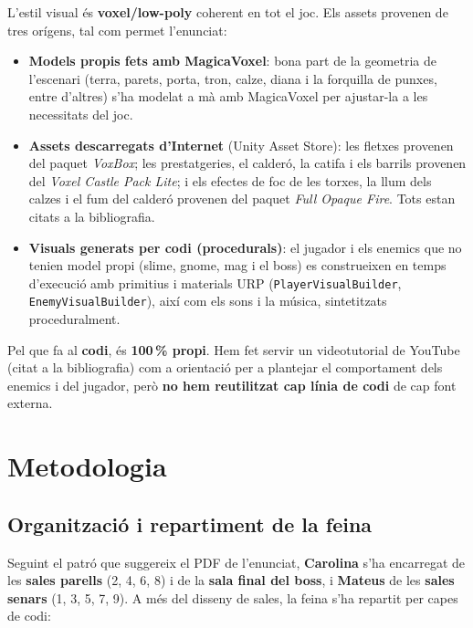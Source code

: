 \documentclass[11pt,a4paper]{article}
\begin{document}
L'estil visual és \textbf{voxel/low-poly} coherent en tot el joc. Els assets
provenen de tres orígens, tal com permet l'enunciat:

\begin{itemize}[noitemsep]
    \item \textbf{Models propis fets amb MagicaVoxel}: bona part de la geometria
    de l'escenari (terra, parets, porta, tron, calze, diana i la forquilla de
    punxes, entre d'altres) s'ha modelat a mà amb MagicaVoxel per ajustar-la a les
    necessitats del joc.
    \item \textbf{Assets descarregats d'Internet} (Unity Asset Store): les fletxes
    provenen del paquet \textit{VoxBox}; les prestatgeries, el calderó, la catifa
    i els barrils provenen del \textit{Voxel Castle Pack Lite}; i els efectes de
    foc de les torxes, la llum dels calzes i el fum del calderó provenen del paquet
    \textit{Full Opaque Fire}. Tots estan citats a la bibliografia.
    \item \textbf{Visuals generats per codi (procedurals)}: el jugador i els
    enemics que no tenien model propi (slime, gnome, mag i el boss) es construeixen
    en temps d'execució amb primitius i materials URP
    (\texttt{PlayerVisualBuilder}, \texttt{EnemyVisualBuilder}), així com els sons
    i la música, sintetitzats proceduralment.
\end{itemize}

Pel que fa al \textbf{codi}, és \textbf{100\,\% propi}. Hem fet servir un
videotutorial de YouTube (citat a la bibliografia) com a orientació per a
plantejar el comportament dels enemics i del jugador, però \textbf{no hem
reutilitzat cap línia de codi} de cap font externa.

\section{Metodologia}
\label{sec:metodologia}

\subsection{Organització i repartiment de la feina}

Seguint el patró que suggereix el PDF de l'enunciat,
\textbf{Carolina} s'ha encarregat de les \textbf{sales parells} (2, 4, 6, 8) i de
la \textbf{sala final del boss}, i \textbf{Mateus} de les \textbf{sales senars}
(1, 3, 5, 7, 9). A més del disseny de sales, la feina s'ha repartit per capes de
codi:
\end{document}
